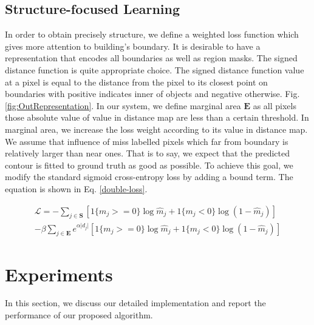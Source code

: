 \documentclass[runningheads]{llncs}
\begin{document}
\subsection{Structure-focused Learning}
    In order to obtain precisely structure, we define a weighted loss function which gives more attention to building's boundary. It is desirable to have a representation that encodes all boundaries as well as region masks. The signed distance function  is quite appropriate choice. The signed distance function value at a pixel is equal to the distance from the pixel to its closest point on boundaries with positive indicates inner of objects and negative otherwise. Fig. \ref{fig:OutRepresentation}. In our system, we define marginal area $\mathbf{E}$ as all pixels those absolute value of value in distance map are less than a certain threshold. In marginal area, we increase the loss weight according to its value in distance map. We assume that influence of miss labelled pixels which far from boundary is relatively larger than near ones. That is to say, we expect that the predicted contour is fitted to ground truth as good as possible. To achieve this goal, we modify the standard   sigmoid cross-entropy loss by adding a bound term. The equation is shown in Eq. \ref{double-loss}.  
       
 \begin{equation}
	\label{double-loss}
	\begin{aligned}
	 \mathcal{L} = - \sum_{j \in \mathbf{S}} \left[ 1\{m_j >= 0\} \log{\hat{m}_j} + 1\{m_j < 0\}\log{(1 - \hat{m}_j)} \right] \\
     - \beta \sum_{j \in \mathbf{E}} e^{\alpha \vert d_j \vert}  \left[ 1\{m_j >= 0\} \log{\hat{m}_j} + 1\{m_j < 0\} \log{(1 - \hat{m}_j)} \right]
	\end{aligned}
 \end{equation}
 
\section{Experiments}
In this section, we discuss our detailed implementation and report the performance of our proposed algorithm.
\end{document}
